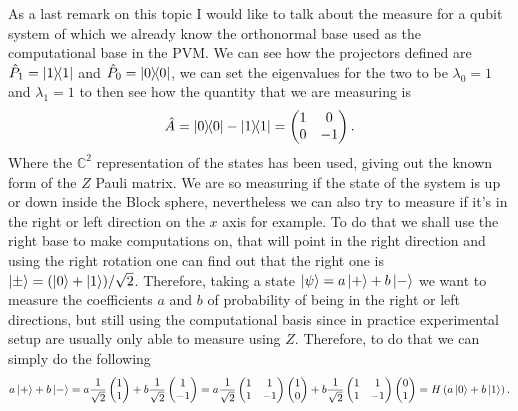 As a last remark on this topic I would like to talk about the measure for a qubit system of which we already know the orthonormal base used as the computational base in the PVM. We can see how the projectors defined are $\hat{P}_1 = \ketbra{1}$ and $\hat{P}_0 = \ketbra{0}$, we can set the eigenvalues for the two to be $\lambda_0 = 1$ and $\lambda_1 = 1$ to then see how the quantity that we are measuring is
\begin{equation}
    \hat{A} = \ketbra{0} - \ketbra{1} = \begin{pmatrix}
        1 & 0\\
        0 & -1
    \end{pmatrix}.
\end{equation}
Where the $\mathbb{C}^2$ representation of the states has been used, giving out the known form of the $Z$ Pauli matrix. We are so measuring if the state of the system is up or down inside the Block sphere, nevertheless we can also try to measure if it's in the right or left direction on the $x$ axis for example. To do that we shall use the right base to make computations on, that will point in the right direction and using the right rotation one can find out that the right one is $\ket{\pm} = (\ket{0} + \ket{1})/\sqrt{2}$. Therefore, taking a state $\ket{\psi} = a\ket{+} + b\ket{-}$ we want to measure the coefficients $a$ and $b$ of probability of being in the right or left directions, but still using the computational basis since in practice experimental setup are usually only able to measure using $Z$. Therefore, to do that we can simply do the following
\begin{equation}
    a\ket{+} + b\ket{-} = a\frac{1}{\sqrt{2}}\begin{pmatrix}
        1\\
        1
    \end{pmatrix} + b \frac{1}{\sqrt{2}}\begin{pmatrix}
        1\\
        -1
    \end{pmatrix} = a \frac{1}{\sqrt{2}}\begin{pmatrix}
        1 & 1\\
        1 & -1
    \end{pmatrix}\begin{pmatrix}
        1\\
        0
    \end{pmatrix} + b\frac{1}{\sqrt{2}}\begin{pmatrix}
        1 & 1\\
        1 & -1
    \end{pmatrix}\begin{pmatrix}
        0\\
        1
    \end{pmatrix} = H\left( a\ket{0} + b\ket{1} \right).
\end{equation}

